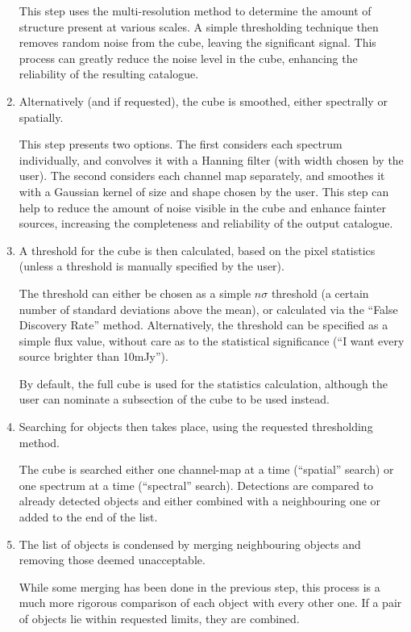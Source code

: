 \begin{enumerate}
  This step uses the multi-resolution \atrous method to determine the
  amount of structure present at various scales. A simple thresholding
  technique then removes random noise from the cube, leaving the
  significant signal. This process can greatly reduce the noise level
  in the cube, enhancing the reliability of the resulting catalogue.

\item Alternatively (and if requested), the cube is smoothed, either
  spectrally or spatially.

  This step presents two options. The first considers each spectrum
  individually, and convolves it with a Hanning filter (with width
  chosen by the user). The second considers each channel map
  separately, and smoothes it with a Gaussian kernel of size and shape
  chosen by the user. This step can help to reduce the amount of noise
  visible in the cube and enhance fainter sources, increasing the
  completeness and reliability of the output catalogue.

\item A threshold for the cube is then calculated, based on the pixel
  statistics (unless a threshold is manually specified by the user).

  The threshold can either be chosen as a simple $n\sigma$ threshold
  (\ie a certain number of standard deviations above the mean), or
  calculated via the ``False Discovery Rate'' method. Alternatively,
  the threshold can be specified as a simple flux value, without care
  as to the statistical significance (\eg ``I want every source
  brighter than 10mJy'').

  By default, the full cube is used for the statistics calculation,
  although the user can nominate a subsection of the cube to be used
  instead. 

\item Searching for objects then takes place, using the requested
  thresholding method.

  The cube is searched either one channel-map at a time (``spatial''
  search) or one spectrum at a time (``spectral'' search). Detections
  are compared to already detected objects and either combined with a
  neighbouring one or added to the end of the list.

\item The list of objects is condensed by merging neighbouring objects
  and removing those deemed unacceptable.

  While some merging has been done in the previous step, this process
  is a much more rigorous comparison of each object with every other
  one. If a pair of objects lie within requested limits, they are
  combined. 


\end{enumerate}
